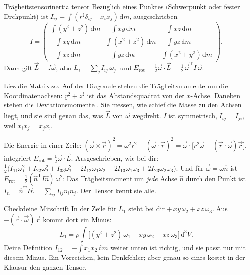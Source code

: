 \documentclass[deutsch]{kaelearn}
\newcommand\dd{\mathrm{d}}
\begin{document}
\begin{definition}{Trägheitstensor}{inertia tensor}
Bezüglich eines Punktes (Schwerpunkt oder fester Drehpunkt) ist $I_{ij} = \int(r^2\delta_{ij}-x_ix_j)\,\dd m$, ausgeschrieben
\[
  I = \begin{pmatrix}
    \int(y^2+z^2)\,\dd m & -\int xy\,\dd m & -\int xz\,\dd m\\[2pt]
    -\int xy\,\dd m & \int(x^2+z^2)\,\dd m & -\int yz\,\dd m\\[2pt]
    -\int xz\,\dd m & -\int yz\,\dd m & \int(x^2+y^2)\,\dd m
  \end{pmatrix}.
\]
Dann gilt $\vec L = I\vec\omega$, also $L_i = \sum_jI_{ij}\,\omega_j$, und $E_{\mathrm{rot}} = \frac12\vec\omega\cdot\vec L = \frac12\,\vec\omega^{\mathrm T}I\,\vec\omega$.
\end{definition}

Lies die Matrix so. Auf der Diagonale stehen die Trägheitsmomente um die Koordinatenachsen: $y^2+z^2$ ist das Abstandsquadrat von der
$x$-Achse. Daneben stehen die Deviationsmomente . Sie messen, wie schief die Masse zu den Achsen liegt, und
sie sind genau das, was $\vec L$ von $\vec\omega$ wegdreht. $I$ ist symmetrisch, $I_{ij} = I_{ji}$, weil $x_ix_j = x_jx_i$.

Die Energie in einer Zeile: $(\vec\omega\times\vec r)^2 = \omega^2r^2-(\vec\omega\cdot\vec r)^2 = \vec\omega\cdot\big[r^2\vec\omega-(\vec r\cdot\vec\omega)\vec r\big]$,
integriert $E_{\mathrm{rot}} = \frac12\vec\omega\cdot\vec L$. Ausgeschrieben, wie bei dir:
$\frac12\big(I_{11}\omega_1^2+I_{22}\omega_2^2+I_{33}\omega_3^2+2I_{12}\omega_1\omega_2+2I_{13}\omega_1\omega_3+2I_{23}\omega_2\omega_3\big)$.
Und für $\vec\omega = \omega\hat n$ ist $E_{\mathrm{rot}} = \frac12(\hat n^{\mathrm T}I\hat n)\,\omega^2$: Das Trägheitsmoment um \emph{jede}
Achse $\hat n$ durch den Punkt ist $I_n = \hat n^{\mathrm T}I\hat n = \sum_{ij}I_{ij}n_in_j$. Der Tensor kennt sie alle.

\begin{panel}[unbreakable]{Check}{deine Mitschrift}{}
In der Zeile für $L_1$ steht bei dir $+\,xy\,\omega_2 + xz\,\omega_3$. Aus $-(\vec r\cdot\vec\omega)\,\vec r$ kommt dort ein Minus:
\[
  L_1 = \rho\int\big[(y^2+z^2)\,\omega_1 - xy\,\omega_2 - xz\,\omega_3\big]\,\dd^3V .
\]
Deine Definition $I_{12} = -\int x_1x_2\,\dd m$ weiter unten ist richtig, und sie passt nur mit diesem Minus. Ein Vorzeichen, kein
Denkfehler; aber genau so eines kostet in der Klausur den ganzen Tensor.
\end{panel}
\end{document}
